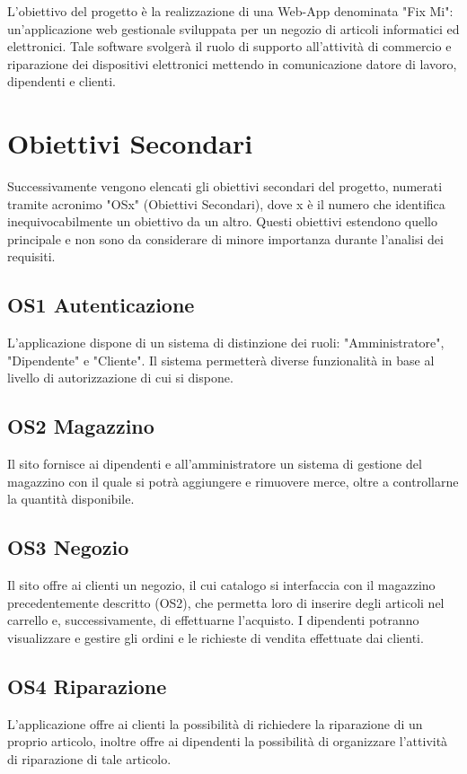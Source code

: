 \documentclass{report}
\begin{document}
L’obiettivo del progetto è la realizzazione di una Web-App denominata "Fix Mi": un'applicazione web gestionale sviluppata per un negozio di articoli informatici ed elettronici. Tale software svolgerà il ruolo di supporto all’attività di commercio e riparazione dei dispositivi elettronici mettendo in comunicazione datore di lavoro, dipendenti e clienti.


\section{Obiettivi Secondari}

Successivamente vengono elencati gli obiettivi secondari del progetto, numerati tramite acronimo "OSx" (Obiettivi Secondari), dove x è il numero che identifica inequivocabilmente un obiettivo da un altro. Questi obiettivi estendono quello principale e non sono da considerare di minore importanza durante l’analisi dei requisiti.


\subsection*{OS1 Autenticazione}
L’applicazione dispone di un sistema di distinzione dei ruoli: "Amministratore", "Dipendente" e "Cliente". Il sistema permetterà diverse funzionalità in base al livello di autorizzazione di cui si dispone.


\subsection*{OS2 Magazzino}
Il sito fornisce ai dipendenti e all'amministratore un sistema di gestione del magazzino con il quale si potrà aggiungere e rimuovere merce, oltre a controllarne la quantità disponibile.


\subsection*{OS3 Negozio}
Il sito offre ai clienti un negozio, il cui catalogo si interfaccia con il magazzino precedentemente descritto (OS2), che permetta loro di inserire degli articoli nel carrello e, successivamente, di effettuarne l'acquisto. I dipendenti potranno visualizzare e gestire gli ordini e le richieste di vendita effettuate dai clienti.


\subsection*{OS4 Riparazione}
L’applicazione offre ai clienti la possibilità di richiedere la riparazione di un proprio articolo, inoltre offre ai dipendenti la possibilità di organizzare l’attività di riparazione di tale articolo.
\end{document}

